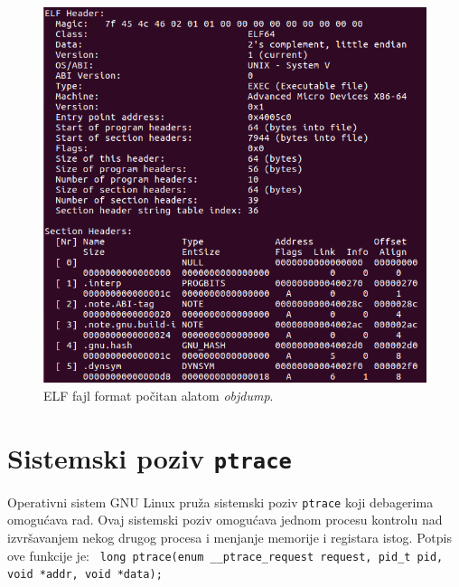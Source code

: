\documentclass[12pt,oneside]{memoir}
\begin{document}
\begin{figure}[h!]
	\begin{center}
		\includegraphics[scale=0.5]{slike/elf_example.png}
	\end{center}
	\caption{ELF fajl format počitan alatom \emph{objdump}.}
	\label{fig:elf}
\end{figure}

\section{Sistemski poziv \texttt{ptrace}}

Operativni sistem GNU Linux pruža sistemski poziv \texttt{ptrace} \cite{ptrace} koji debagerima omogućava rad. Ovaj sistemski poziv omogućava jednom procesu kontrolu nad izvršavanjem nekog drugog procesa i menjanje memorije i registara istog.
Potpis ove funkcije je:
\newline\newline
\texttt{ long ptrace\newline(enum \_\_ptrace\_request request, pid\_t pid, void *addr, void *data);}
\newline
\end{document}
